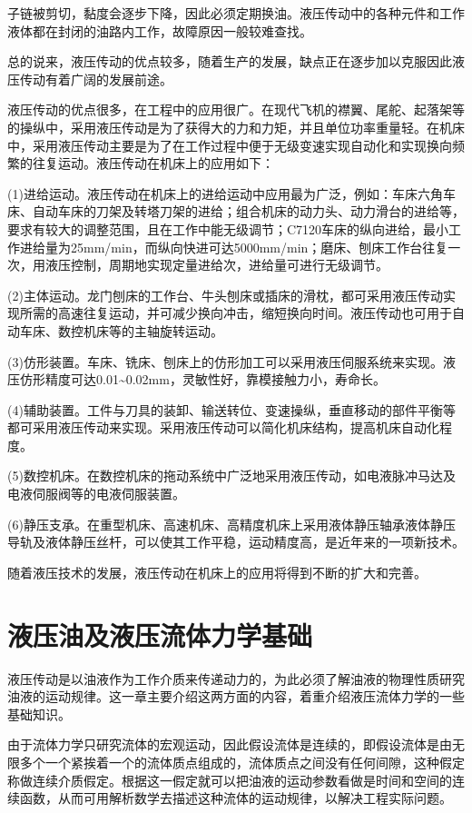 子链被剪切，黏度会逐步下降，因此必须定期换油。液压传动中的各种元件和工作液体都在封闭的油路内工作，故障原因一般较难查找。

总的说来，液压传动的优点较多，随着生产的发展，缺点正在逐步加以克服因此液压传动有着广阔的发展前途。

液压传动的优点很多，在工程中的应用很广。在现代飞机的襟翼、尾舵、起落架等的操纵中，采用液压传动是为了获得大的力和力矩，并且单位功率重量轻。在机床中，采用液压传动主要是为了在工作过程中便于无级变速实现自动化和实现换向频繁的往复运动。液压传动在机床上的应用如下：

(1)进给运动。液压传动在机床上的进给运动中应用最为广泛，例如：车床六角车床、自动车床的刀架及转塔刀架的进给；组合机床的动力头、动力滑台的进给等，要求有较大的调整范围，且在工作中能无级调节；C7120车床的纵向进给，最小工作进给量为25mm/min，而纵向快进可达5000mm/min；磨床、刨床工作台往复一次，用液压控制，周期地实现定量进给次，进给量可进行无级调节。

(2)主体运动。龙门刨床的工作台、牛头刨床或插床的滑枕，都可采用液压传动实现所需的高速往复运动，并可减少换向冲击，缩短换向时间。液压传动也可用于自动车床、数控机床等的主轴旋转运动。

(3)仿形装置。车床、铣床、刨床上的仿形加工可以采用液压伺服系统来实现。液压仿形精度可达0.01\textasciitilde0.02mm，灵敏性好，靠模接触力小，寿命长。

(4)辅助装置。工件与刀具的装卸、输送转位、变速操纵，垂直移动的部件平衡等都可采用液压传动来实现。采用液压传动可以简化机床结构，提高机床自动化程度。

(5)数控机床。在数控机床的拖动系统中广泛地采用液压传动，如电液脉冲马达及电液伺服阀等的电液伺服装置。

(6)静压支承。在重型机床、高速机床、高精度机床上采用液体静压轴承液体静压导轨及液体静压丝杆，可以使其工作平稳，运动精度高，是近年来的一项新技术。

随着液压技术的发展，液压传动在机床上的应用将得到不断的扩大和完善。

\chapter{液压油及液压流体力学基础}

液压传动是以油液作为工作介质来传递动力的，为此必须了解油液的物理性质研究油液的运动规律。这一章主要介绍这两方面的内容，着重介绍液压流体力学的一些基础知识。

由于流体力学只研究流体的宏观运动，因此假设流体是连续的，即假设流体是由无限多个一个紧挨着一个的流体质点组成的，流体质点之间没有任何间隙，这种假定称做连续介质假定。根据这一假定就可以把油液的运动参数看做是时间和空间的连续函数，从而可用解析数学去描述这种流体的运动规律，以解决工程实际问题。

